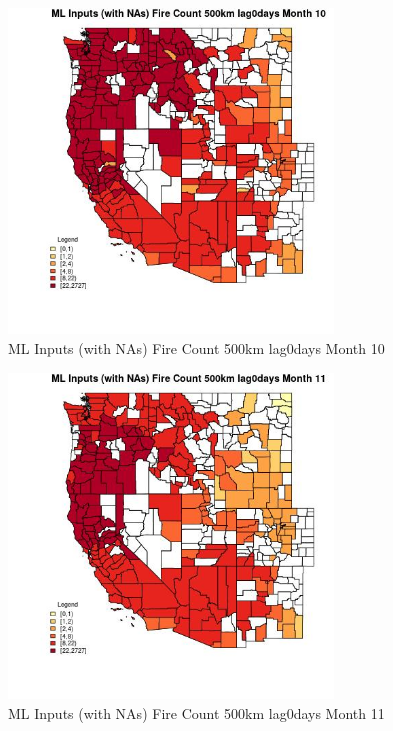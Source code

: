 \begin{figure} 
\centering  
\includegraphics[width=0.77\textwidth]{Code_Outputs/Report_ML_input_PM25_Step4_part_f_de_duplicated_aveswNAs_CountyFire_Count_500km_lag0daysmedianMonth10.jpg} 
\caption{\label{fig:Report_ML_input_PM25_Step4_part_f_de_duplicated_aveswNAsCountyFire_Count_500km_lag0daysmedianMonth10}ML Inputs (with NAs) Fire Count 500km lag0days Month 10} 
\end{figure} 
 

\begin{figure} 
\centering  
\includegraphics[width=0.77\textwidth]{Code_Outputs/Report_ML_input_PM25_Step4_part_f_de_duplicated_aveswNAs_CountyFire_Count_500km_lag0daysmedianMonth11.jpg} 
\caption{\label{fig:Report_ML_input_PM25_Step4_part_f_de_duplicated_aveswNAsCountyFire_Count_500km_lag0daysmedianMonth11}ML Inputs (with NAs) Fire Count 500km lag0days Month 11} 
\end{figure} 
 

